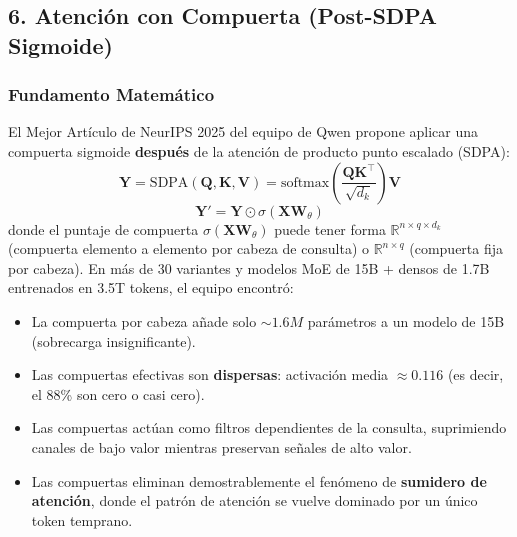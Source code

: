 \subsection{6. Atención con Compuerta (Post-SDPA Sigmoide)}

\subsubsection{Fundamento Matemático}

El Mejor Artículo de NeurIPS 2025 del equipo de Qwen propone aplicar una compuerta sigmoide \textbf{después} de la atención de producto punto escalado (SDPA):
\[
\mathbf{Y} = \text{SDPA}(\mathbf{Q}, \mathbf{K}, \mathbf{V}) = \text{softmax}\left(\frac{\mathbf{Q}\mathbf{K}^\top}{\sqrt{d_k}}\right) \mathbf{V}
\]
\[
\mathbf{Y}' = \mathbf{Y} \odot \sigma\left(\mathbf{X} \mathbf{W}_\theta\right)
\]
donde el puntaje de compuerta $\sigma(\mathbf{X} \mathbf{W}_\theta)$ puede tener forma $\mathbb{R}^{n \times q \times d_k}$ (compuerta elemento a elemento por cabeza de consulta) o $\mathbb{R}^{n \times q}$ (compuerta fija por cabeza). En más de 30 variantes y modelos MoE de 15B + densos de 1.7B entrenados en 3.5T tokens, el equipo encontró:

\begin{itemize}[leftmargin=*]
    \item La compuerta por cabeza añade solo $\sim 1.6M$ parámetros a un modelo de 15B (sobrecarga insignificante).
    \item Las compuertas efectivas son \textbf{dispersas}: activación media $\approx 0.116$ (es decir, el 88\% son cero o casi cero).
    \item Las compuertas actúan como filtros dependientes de la consulta, suprimiendo canales de bajo valor mientras preservan señales de alto valor.
    \item Las compuertas eliminan demostrablemente el fenómeno de \textbf{sumidero de atención}, donde el patrón de atención se vuelve dominado por un único token temprano.
\end{itemize}

